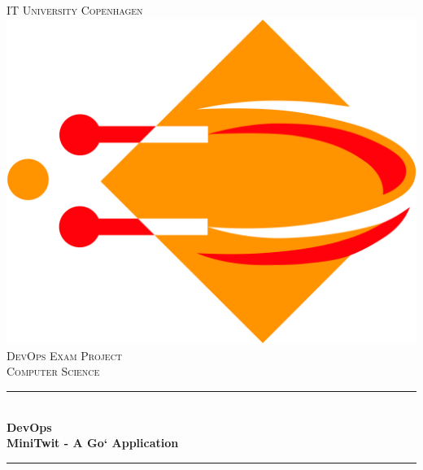\begin{titlepage}

\newcommand{\HRule}{\rule{\linewidth}{0.5mm}} %

\center %
 

\textsc{\LARGE IT University Copenhagen}\\[1.5cm] %
\includegraphics[scale=.1]{images/ITU.png}\\[1cm] %
\textsc{\Large DevOps Exam Project}\\[0.5cm] %
\textsc{\large Computer Science}\\[0.5cm] %


\HRule \\[0.4cm]
{ \huge \bfseries DevOps\\ MiniTwit - A Go` Application }\\[0.4cm] %
\HRule \\[1.5cm]
 

\end{titlepage}
